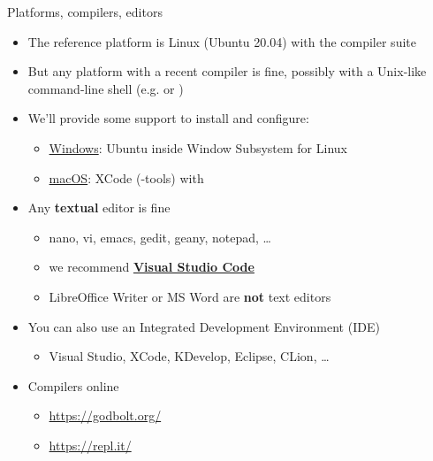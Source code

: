 \begin{frame}{Platforms, compilers, editors}
  \begin{itemize}[<+->]
  \item The reference platform is Linux (Ubuntu 20.04) with the 
    compiler suite
  \item But any platform with a recent compiler is fine, possibly with a
    Unix-like command-line shell (e.g.  or )
  \item We'll provide some support to install and configure:
    \begin{itemize}[<.->]
    \item
      \href{https://github.com/giacomini/pf2021/blob/main/doc/WSLGuide.md}{Windows}:
      Ubuntu inside Window Subsystem for Linux
    \item
      \href{https://github.com/giacomini/pf2021/blob/main/doc/macOSGuide.md}{macOS}:
      XCode (-tools) with 
    \end{itemize}
  \item Any \textbf{textual} editor is fine
    \begin{itemize}[<.->]
    \item nano, vi, emacs, gedit, geany, notepad, \ldots
    \item we recommend \href{https://code.visualstudio.com/}{\textbf{Visual
          Studio Code}}
    \item LibreOffice Writer or MS Word are \textbf{not} text editors
    \end{itemize}
  \item You can also use an Integrated Development Environment (IDE)
    \begin{itemize}[<.->]
    \item Visual Studio, XCode, KDevelop, Eclipse, CLion, \ldots
    \end{itemize}
  \item Compilers online
    \begin{itemize}
    \item \url{https://godbolt.org/}
    \item \url{https://repl.it/}
    \end{itemize}
  \end{itemize}
\end{frame}

